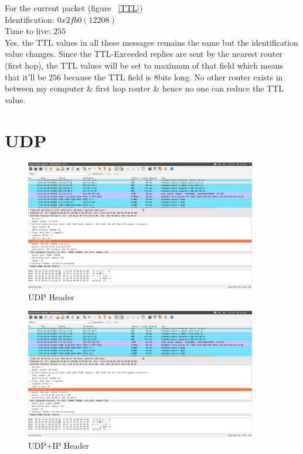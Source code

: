 \documentclass[a4,11pt]{article}
\newenvironment{sol}
{ \color{Black}
  \begin{solution}
}
{ \end{solution} }
\begin{document}
\begin{enumerate}
\begin{sol}
    For the current packet (figure ~\ref{TTL}) \\
    Identification: $0x2fb0 (12208)$ \\
    Time to live: $255$ \\
    
    Yes, the TTL values in all these messages remains the same but the identification value changes.
    Since the TTL-Exceeded replies are sent by the nearest router (first hop), the TTL values will be set to maximum of that field which
    means that it'll be $256$ because the TTL field is 8bits long. No other router exists in between my computer \& first hop router \&
    hence no one can reduce the TTL value.\\
    
  \end{sol}
 \end{enumerate}
\pagebreak

\section{UDP}
  \begin{figure}[h!]
      \includegraphics[width=0.9\textwidth]{udp-ip-header.png}
          \caption{UDP Header}
  \end{figure}

       \begin{figure}[h!tb]
      \includegraphics[width=0.9\textwidth]{udp-ip-header.png}
          \caption{UDP+IP Header}
          \label{fig:udp_ip}
  \end{figure}
  
\end{document}
